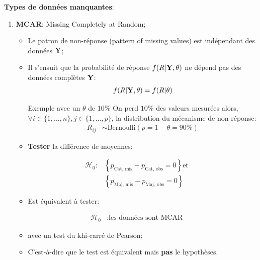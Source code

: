 \documentclass[10pt, french]{article}
\begin{document}
\begin{multicols*}{3}
\textbf{Types de données manquantes}:
\begin{enumerate}
	\item	\textbf{MCAR}: Missing Completely at Random;
		\begin{itemize}[leftmargin = *]
		\item	Le patron de non-réponse (pattern of missing values) est indépendant des données $\mathbf{Y}$;
		\item	Il s'ensuit que la probabilité de réponse $f(R | \mathbf{Y}, \theta)$ ne dépend pas des données complètes $\mathbf{Y}$:
			\begin{align*}
			f(R | \mathbf{Y}, \theta) &= f(R | \theta) \\
			\end{align*}
		\begin{examplebox}{Exemple avec un $\theta$ de 10\%}
		On perd $10\%$ des valeurs mesurées alors, $\forall i \in \{1, \dots, n\}, j \in \{1, \dots, p\}$, la distribution du mécanisme de non-réponse:
		\setlength{\mathindent}{-1cm}
			\begin{align*}
			R_{ij} 
			&\sim 	\text{Bernoulli}(p = 1 - \theta =  90\%)
			\end{align*}
		\setlength{\mathindent}{1cm}
		\end{examplebox}
		\item	\textbf{Tester} la différence de moyennes:
		\end{itemize}	
		\setlength{\mathindent}{-2cm}
			\begin{align*}
			\mathcal{H}_{0}:
			&\left\{ p_{\text{Cat, mis}} - p_{\text{Cat, obs}} = 0 \right\} 
			\text{et}	\\
			&\left\{ p_{\text{Maj, mis}} - p_{\text{Maj, obs}} = 0 \right\}
			\end{align*}
		\setlength{\mathindent}{1cm}
		\begin{itemize}
		\item[]	Est équivalent à tester: 
		\end{itemize}	
		\setlength{\mathindent}{-2cm}
			\begin{align*}
			\mathcal{H}_{0}
			&:	\text{les données sont MCAR}
			\end{align*}
		\setlength{\mathindent}{1cm}
		\begin{itemize}
		\item[]	avec un test du khi-carré de Pearson;
		\item[]	C'est-à-dire que le test est équivalent mais \textbf{pas} le hypothèses.
		\end{itemize}	

\end{enumerate}
\end{multicols*}
\end{document}
